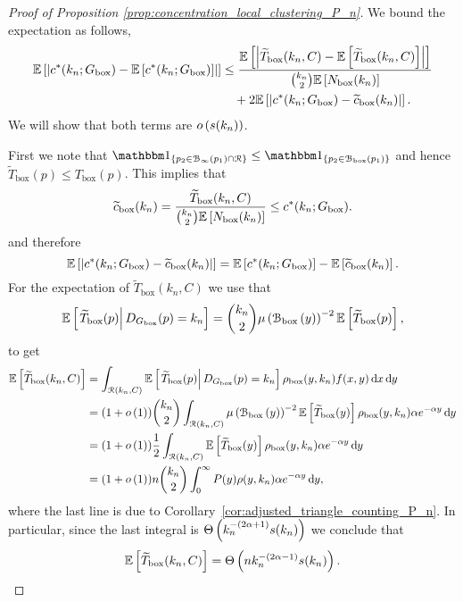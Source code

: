 \begin{proof}[Proof of Proposition \ref{prop:concentration_local_clustering_P_n}]
We bound the expectation as follows,
\begin{align*}
	\mathbb{E}\left[\left|c^\ast(k_n; G_{\mathrm{box}}) - \mathbb{E}\left[c^\ast(k_n; G_{\mathrm{box}})\right]\right|\right] 
	&\le \frac{\mathbb{E}\left[\left|\widetilde{T}_{\text{box}}(k_n,C) - \mathbb{E}\left[\widetilde{T}_{\text{box}}(k_n,C)\right]\right|\right]}
		{\binom{k_n}{2}\mathbb{E}\left[N_{\text{box}}(k_n)\right]}\\
	&\hspace{10pt} + 2 \mathbb{E}\left[\left|c^\ast(k_n; G_{\mathrm{box}}) - \widetilde{c}_{\text{box}}(k_n)\right|\right].
\end{align*}
We will show that both terms are $o\left(s(k_n)\right)$.

First we note that $\ind{p_2 \in \BallPo{p_1} \cap \Rcal} \le \ind{p_2 \in \BallPon{p_1}}$ and hence $\widetilde{T}_{\text{box}}(p) \le T_{\text{box}}(p)$. This implies that
\[
	 \widetilde{c}_{\text{box}}(k_n) = \frac{\widetilde{T}_{\text{box}}(k_n,C)}{\binom{k_n}{2}\mathbb{E}\left[N_{\text{box}}(k_n)\right]} \le c^\ast(k_n; G_{\mathrm{box}}). 
\]
and therefore
\[
	\mathbb{E}\left[\left|c^\ast(k_n; G_{\mathrm{box}}) - \widetilde{c}_{\text{box}}(k_n)\right|\right]
	= \mathbb{E}\left[c^\ast(k_n; G_{\mathrm{box}})\right] - \mathbb{E}\left[\widetilde{c}_{\text{box}}(k_n)\right].
\]
For the expectation of $\widetilde{T}_{\text{box}}(k_n,C)$ we use that 
\[
	\mathbb{E}\left[\left.\widetilde{T}_{\text{box}}(p)\right|D_{G_{\mathrm{box}}}(p) = k_n\right]
= \binom{k_n}{2} \mu\left({\mathcal B}_{\text{box}}\left(y\right)\right)^{-2} \mathbb{E}\left[\widetilde{T}_{\text{box}}(p)\right],
\] 
to get
\begin{align*}
	\mathbb{E}\left[\widetilde{T}_{\text{box}}(k_n,C)\right] 
	&= \int_{{\mathcal R}(k_n,C)} \mathbb{E}\left[\left.\widetilde{T}_{\text{box}}(p)\right|D_{G_{\mathrm{box}}}(p) = k_n\right]
		\rho_{\text{box}}(y,k_n) f(x,y) \operatorname{\mathrm{d}\hspace{-2pt}} x \operatorname{\mathrm{d}\hspace{-2pt}} y\\
	&= (1+o\left(1\right)) \binom{k_n}{2} \int_{{\mathcal R}(k_n,C)} \mu\left({\mathcal B}_{\text{box}}\left(y\right)\right)^{-2} \mathbb{E}\left[\widetilde{T}_{\text{box}}(y)\right]
		\rho_{\text{box}}(y,k_n) \alpha e^{-\alpha y} \operatorname{\mathrm{d}\hspace{-2pt}} y\\
	&= (1+o\left(1\right)) \frac{1}{2} \int_{{\mathcal R}(k_n,C)} \mathbb{E}\left[\widetilde{T}_{\text{box}}(y)\right]
			\rho_{\text{box}}(y,k_n) \alpha e^{-\alpha y} \operatorname{\mathrm{d}\hspace{-2pt}} y\\
	&= (1+o\left(1\right)) n \binom{k_n}{2} \int_0^\infty P(y) \rho(y,k_n) \alpha e^{-\alpha y} \operatorname{\mathrm{d}\hspace{-2pt}} y,
\end{align*}
where the last line is due to Corollary~\ref{cor:adjusted_triangle_counting_P_n}. In particular, since the last integral is $\Theta\left(k_n^{-(2\alpha + 1)} s(k_n)\right)$ we conclude that
\begin{equation}\label{eq:scaling_exected_tilde_T}
	\mathbb{E}\left[\widetilde{T}_{\text{box}}(k_n,C)\right] = \Theta\left(n k_n^{-(2\alpha - 1)}s(k_n)\right). 
\end{equation}


\end{proof}
